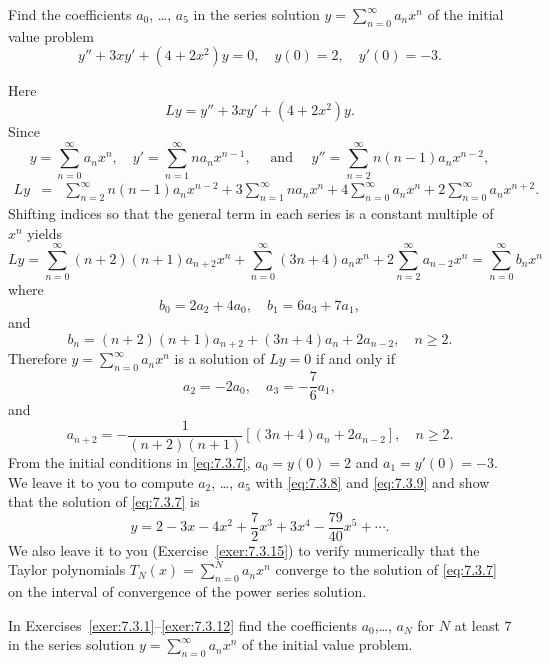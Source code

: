\begin{example}
  \label{example:7.3.3} \rm Find the coefficients $a_{0}$, \dots, $a_{5}$ in the series solution
  $y=\sum^{\infty}_{n=0}a_{n}x^{n}$ of the initial value problem
  \begin{equation}
    \label{eq:7.3.7}y''+3xy'+(4+2x^{2})y=0,\quad y(0)=2,\quad y'(0)=-3.
  \end{equation}
\end{example}

\begin{examplesolution}
\solution Here
\[
  Ly=y''+3xy'+(4+2x^{2})y.
\]
Since
\[
  y=\sum^{\infty}_{n=0}a_{n}x^{n},\quad y'=\sum^{\infty}_{n=1}n a_{n}x^{n-1},\quad\mbox{ and }\quad y''=\sum^{\infty}_{n=2}n(n-1)a_{n}x^{n-2},
\]
\begin{eqnarray*}
  Ly & = & \sum^{\infty}_{n=2}n(n-1)a_{n}x^{n-2}+3\sum^{\infty}_{n=1}na_{n}x^{n}+4\sum^{\infty}_{n=0}a_{n}x^{n}+2\sum^{\infty}_{n=0}a_{n}x^{n+2}.
\end{eqnarray*}
Shifting indices so that the general term in each series is a constant multiple of $x^{n}$ yields
\[
  Ly=\sum^{\infty}_{n=0}(n+2)(n+1)a_{n+2}x^{n}+\sum^{\infty}_{n=0}(3n+4)a_{n}x^{n}+2\sum^{\infty}_{n=2}a_{n-2}x^{n}=\sum_{n=0}^{\infty}b_{n}x^{n}
\]
where
\[
  b_{0}=2a_{2}+4a_{0},\quad b_{1}=6a_{3}+7a_{1},
\]
and
\[
  b_{n}=(n+2)(n+1)a_{n+2}+(3n+4)a_{n}+2a_{n-2},\quad n\ge2.
\]
Therefore $y=\sum^{\infty}_{n=0}a_{n}x^{n}$ is a solution of $Ly=0$ if and only if
\begin{equation}
  \label{eq:7.3.8}a_{2}=-2a_{0},\quad a_{3}=-\frac{7}{6}a_{1},
\end{equation}
and
\begin{equation}
  \label{eq:7.3.9}a_{n+2}=-\frac{1}{(n+2)(n+1)}\left[(3n+4)a_{n}+2a_{n-2}\right],\quad n\ge2.
\end{equation}
From the initial conditions in \eqref{eq:7.3.7}, $a_{0}=y(0)=2$ and $a_{1}=y'(0)=-3$. We leave it to
you to compute $a_{2}$, \dots, $a_{5}$ with \eqref{eq:7.3.8} and \eqref{eq:7.3.9} and show that the
solution of \eqref{eq:7.3.7} is
\[
  y=2-3x-4x^{2}+\frac{7}{2}x^{3}+3x^{4}-\frac{79}{40}x^{5}+\cdots.
\]
We also leave it to you (Exercise~\ref{exer:7.3.15}) to verify numerically that the Taylor
polynomials $T_{N}(x)=\sum_{n=0}^{N}a_{n}x^{n}$ converge to the solution of \eqref{eq:7.3.7} on the
interval of convergence of the power series solution.
\end{examplesolution}

\exercises In Exercises~\ref{exer:7.3.1}--\ref{exer:7.3.12} find the coefficients $a_{0}$,\dots, $a_{N}$ for $N$ at least $7$ in the series solution $y=\sum_{n=0}^{\infty}a_{n}x^{n}$ of the initial value problem.

